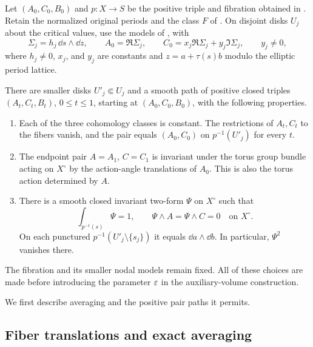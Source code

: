 \begin{proposition}\label{prop:regular-preparation}
Let $(A_0,C_0,B_0)$ and $p\colon X\to S$ be the positive triple and
fibration obtained in .  Retain the normalized original
periods and the class $F$ of .  On disjoint disks
$U_j$ about the critical values, use the models of
, with
\begin{equation}\label{eq:regular-input-model}
 \Sigma_j=h_j\,\dd s\wedge\dd z,
 \qquad A_0=\Re\Sigma_j,
 \qquad C_0=x_j\Re\Sigma_j+y_j\Im\Sigma_j,
 \qquad y_j\ne0,
\end{equation}
where $h_j\ne0$, $x_j$, and $y_j$ are constants and
$z=a+\tau(s)b$ modulo the elliptic period lattice.

There are smaller disks $U'_j\Subset U_j$ and a smooth path of positive
closed triples $(A_t,C_t,B_t)$, $0\le t\le1$, starting at
$(A_0,C_0,B_0)$, with the following properties.
\begin{enumerate}[label=\textup{(\roman*)}]
\item Each of the three cohomology classes is constant.  The restrictions
of $A_t,C_t$ to the fibers vanish, and the pair equals $(A_0,C_0)$ on
$p^{-1}(U'_j)$ for every $t$.
\item The endpoint pair $A=A_1$, $C=C_1$ is invariant under the torus
group bundle acting on $X^\circ$ by the action-angle translations of
$A_0$.  This is also the torus action determined by $A$.
\item There is a smooth closed invariant two-form $\Psi$ on $X^\circ$
such that
\begin{equation}\label{eq:regular-prepared-data}
 \int_{p^{-1}(s)}\Psi=1,
 \qquad \Psi\wedge A=\Psi\wedge C=0
 \quad\text{on }X^\circ.
\end{equation}
On each punctured $p^{-1}(U'_j\setminus\{s_j\})$ it equals
$\dd a\wedge\dd b$.  In particular, $\Psi^2$ vanishes there.
\end{enumerate}
The fibration and its smaller nodal models remain fixed.  All of these
choices are made before introducing the parameter $\varepsilon$ in the
auxiliary-volume construction.
\end{proposition}

We first describe averaging and the positive pair paths it permits.

\subsection{Fiber translations and exact averaging}

